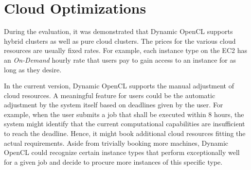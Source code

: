 \section*{Cloud Optimizations}

During the evaluation, it was demonstrated that Dynamic OpenCL supports hybrid clusters as well as pure cloud clusters. The prices for the various cloud resources are usually fixed rates. For example, each instance type on the EC2 has an \textit{On-Demand} hourly rate that users pay to gain access to an instance for as long as they desire.

In the current version, Dynamic OpenCL supports the manual adjustment of cloud resources. A meaningful feature for users could be the automatic adjustment by the system itself based on deadlines given by the user. For example, when the user submits a job that shall be executed within 8 hours, the system might identify that the current computational capabilities are insufficient to reach the deadline. Hence, it might book additional cloud resources fitting the actual requirements. Aside from trivially booking more machines, Dynamic OpenCL could recognize certain instance types that perform exceptionally well for a given job and decide to procure more instances of this specific type.

